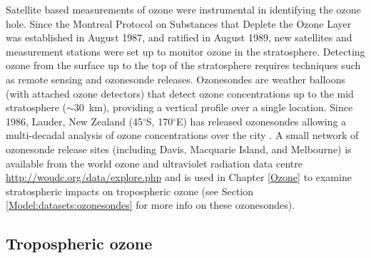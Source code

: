     
    Satellite based measurements of ozone were instrumental in identifying the 
    ozone hole.
    Since the Montreal Protocol on Substances that Deplete the Ozone Layer was 
    established in August 1987, and ratified in August 1989, new satellites and 
    measurement stations were set up to monitor ozone in the stratosphere.
    Detecting ozone from the surface up to the top of the stratosphere requires techniques such as remote sensing and ozonesonde releases.
    Ozonesondes are weather balloons (with attached ozone detectors) that detect ozone concentrations up to the mid stratosphere ($\sim 30$~km), providing a vertical profile over a single location.
    Since 1986, Lauder, New Zealand (45$^{\circ}$S, 170$^{\circ}$E) has released ozonesondes allowing a multi-decadal analysis of ozone concentrations over the city \parencite{Brinksma2002}.
    A small network of ozonesonde release sites (including Davis, Macquarie Island, and Melbourne) is available from the world ozone and ultraviolet radiation data centre \url{http://woudc.org/data/explore.php} and is used in Chapter \ref{Ozone} to examine stratospheric impacts on tropospheric ozone (see Section \ref{Model:datasets:ozonesondes} for more info on these ozonesondes).
  
  \subsection{Tropospheric ozone}
    
